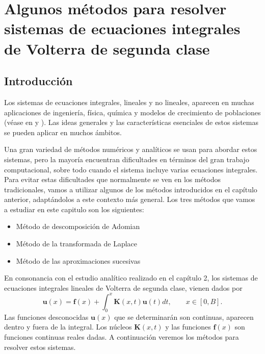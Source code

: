 \chapter{Algunos métodos para resolver sistemas de ecuaciones integrales de Volterra de segunda clase}
\section{Introducción}
Los sistemas de ecuaciones integrales, lineales y no lineales, aparecen en muchas aplicaciones de ingeniería, física, química y modelos de crecimiento de poblaciones (véase en \cite{sistemas1} y \cite{sistemas2}). Las ideas generales y las características esenciales de estos sistemas se pueden aplicar en muchos ámbitos.

Una gran variedad de métodos numéricos y analíticos se usan para abordar estos sistemas, pero la mayoría encuentran dificultades en términos del gran trabajo computacional, sobre todo cuando el sistema incluye varias ecuaciones integrales. Para evitar estas dificultades que normalmente se ven en los métodos tradicionales, vamos a utilizar algunos de los métodos introducidos en el capítulo anterior, adaptándolos a este contexto más general. Los tres métodos que vamos a estudiar en este capitulo son los siguientes:
\begin{itemize}
	\item Método de descomposición de Adomian
	\item Método de la transformada de Laplace
	\item Método de las aproximaciones sucesivas
\end{itemize}

En consonancia con el estudio analítico realizado en el capítulo 2, los sistemas de ecuaciones integrales lineales de Volterra de segunda clase, vienen dados por
\begin{equation}
	\textbf{u}(x) = \textbf{f}(x) + \int_0^x \textbf{K}(x,t)\textbf{u}(t)dt, \qquad x \in [0,B].
\end{equation}
Las funciones desconocidas $\textbf{u}(x)$ que se determinarán son continuas, aparecen dentro y fuera de la integral. Los núcleos $\textbf{K}(x,t)$ y las funciones $\textbf{f}(x)$ son funciones continuas reales dadas. A continuación veremos los métodos para resolver estos sistemas.

